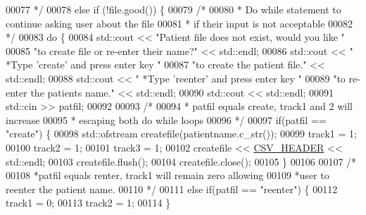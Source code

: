 \begin{DoxyCode}
00077 \textcolor{comment}{             */}
00078             \textcolor{keywordflow}{else} \textcolor{keywordflow}{if} (!file.good()) \{
00079                 \textcolor{comment}{/* }
00080 \textcolor{comment}{                 * Do while statement to continue asking user about the file}
00081 \textcolor{comment}{                 * if their input is not acceptable}
00082 \textcolor{comment}{                 */} 
00083                 \textcolor{keywordflow}{do} \{
00084                     std::cout << \textcolor{stringliteral}{"Patient file does not exist, would you like "}
00085                         \textcolor{stringliteral}{"to create file or re-enter their name?"} << std::endl;
00086                     std::cout << \textcolor{stringliteral}{"  *Type 'create' and press enter key "}
00087                         \textcolor{stringliteral}{"to create the patient file."} << std::endl;
00088                     std::cout << \textcolor{stringliteral}{"  *Type 'reenter' and press enter key "}
00089                         \textcolor{stringliteral}{"to re-enter the patients name."} << std::endl;
00090                     std::cout << std::endl;
00091                     std::cin >> patfil;
00092 
00093                     \textcolor{comment}{/* }
00094 \textcolor{comment}{                     * patfil equals create, track1 and 2 will increase}
00095 \textcolor{comment}{                     * escaping both do while loops}
00096 \textcolor{comment}{                     */}
00097                     \textcolor{keywordflow}{if}(patfil == \textcolor{stringliteral}{"create"}) \{
00098                         std::ofstream createfile(patientname.c\_str());
00099                         track1 = 1;
00100                         track2 = 1;
00101                         track3 = 1;
00102                         createfile << \hyperlink{namespacevaso_ade7cbcaad3dc577b643b3eea4b4e8aa0}{CSV\_HEADER} << std::endl;
00103                         createfile.flush();
00104                         createfile.close();
00105                     \}
00106 
00107                     \textcolor{comment}{/*}
00108 \textcolor{comment}{                     *patfil equals renter, track1 will remain zero allowing}
00109 \textcolor{comment}{                     *user to reenter the patient name.}
00110 \textcolor{comment}{                     */}
00111                     \textcolor{keywordflow}{else} \textcolor{keywordflow}{if}(patfil == \textcolor{stringliteral}{"reenter"}) \{
00112                         track1 = 0;
00113                         track2 = 1;
00114                     \}

\end{DoxyCode}
